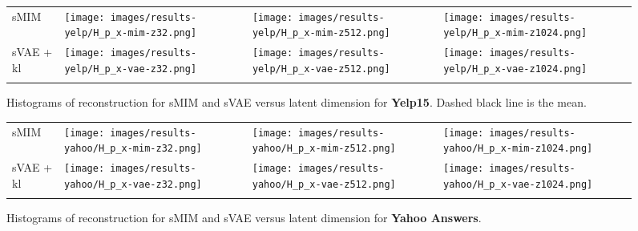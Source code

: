 \documentclass{article}
\begin{document}
\begin{figure}[th]
    \centering
    \setlength{\tabcolsep}{0pt}
    \begin{tabular}{m{} *3{>{\centering\arraybackslash}m{}}}
     sMIM &
     \texttt{[image: images/results-yelp/H\_p\_x-mim-z32.png]}
     &
     \texttt{[image: images/results-yelp/H\_p\_x-mim-z512.png]}
     &
     \texttt{[image: images/results-yelp/H\_p\_x-mim-z1024.png]}
    \\
     sVAE + kl &
     \texttt{[image: images/results-yelp/H\_p\_x-vae-z32.png]}
     &
     \texttt{[image: images/results-yelp/H\_p\_x-vae-z512.png]}
     &
     \texttt{[image: images/results-yelp/H\_p\_x-vae-z1024.png]}
     \\
     &  &  &  
    \end{tabular}
        \vspace*{-0.25cm}
    \caption{  
    Histograms of reconstruction for sMIM and sVAE versus latent dimension for \textbf{Yelp15}.
    Dashed black line is the mean.
    }
    \label{fig:nlp-nll-hist-yelp}
\end{figure}

\begin{figure}[th]
    \centering
    \setlength{\tabcolsep}{0pt}
    \begin{tabular}{m{} *3{>{\centering\arraybackslash}m{}}}
     sMIM &
     \texttt{[image: images/results-yahoo/H\_p\_x-mim-z32.png]}
     &
     \texttt{[image: images/results-yahoo/H\_p\_x-mim-z512.png]}
     &
     \texttt{[image: images/results-yahoo/H\_p\_x-mim-z1024.png]}
    \\
     sVAE + kl &
     \texttt{[image: images/results-yahoo/H\_p\_x-vae-z32.png]}
     &
     \texttt{[image: images/results-yahoo/H\_p\_x-vae-z512.png]}
     &
     \texttt{[image: images/results-yahoo/H\_p\_x-vae-z1024.png]}
     \\
     &  &  &  
    \end{tabular}
        \vspace*{-0.25cm}
    \caption{
  Histograms of reconstruction for sMIM and sVAE versus latent dimension for \textbf{Yahoo Answers}.
    }
    \label{fig:nlp-nll-hist-yahoo}
\end{figure}
\end{document}
